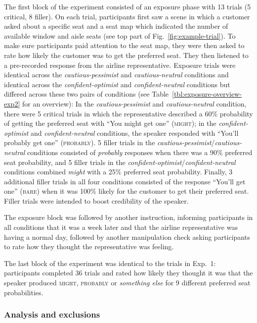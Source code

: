 \documentclass[man,floatsintext]{apa6}
\begin{document}
The first block of the experiment consisted of an exposure phase with 13 trials (5 critical, 8 filler). On each trial, participants first saw a scene in which a customer asked about a specific seat and a seat map which indicated the number of available window and aisle seats (see top part of Fig.~\ref{fig:example-trial}). To make sure participants paid attention to the seat map, they were then asked to rate how likely the customer  was to get the preferred seat. They then listened to a pre-recorded response from the airline representative. Exposure trials were identical across the \textit{cautious-pessimist} and \textit{cautious-neutral} conditions and identical across the \textit{confident-optimist} and \textit{confident-neutral} conditions but differed across these two pairs of conditions (see Table~\ref{tbl:exposure-overview-exp2} for an overview): In the \textit{cautious-pessimist} and \textit{cautious-neutral} condition, there were 5 critical trials in which the representative described a 60\% probability of getting the preferred seat with ``You might get one'' (\textsc{might}); in the \textit{confident-optimist} and \textit{confident-neutral} conditions, the speaker responded with ``You'll probably get one'' (\textsc{probably}). 5 filler trials in the \textit{cautious-pessimist}/\textit{cautious-neutral} conditions consisted of \textit{probably} responses   when there was a 90\% preferred seat probability, and 5 filler trials in the \textit{confident-optimist}/\textit{confident-neutral} conditions combined \textit{might} with a 25\% preferred seat  probability. Finally, 3 additional filler trials in all four conditions consisted of the response ``You'll get one'' (\textsc{bare}) when it was 100\% likely for the customer to get their preferred seat. Filler trials were intended to boost credibility of the speaker.

The exposure block was followed by another instruction, informing participants in all conditions that it was a week later and that the airline representative was having a normal day, followed by another manipulation check asking participants to rate how they thought the representative was feeling. 

The last block of the experiment was identical to the trials in Exp.~1: participants completed 36 trials and rated how likely they thought it was that the speaker produced \textsc{might}, \textsc{probably} or \textit{something else} for 9 different preferred seat probabilities.

\subsubsection{Analysis and exclusions}
\end{document}
